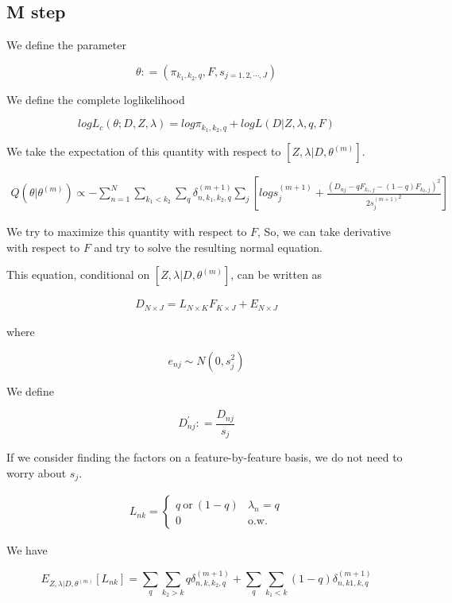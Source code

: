 \documentclass[12pt]{article}
\begin{document}
\subsection{M step}


We define the parameter 

$$ \theta : = \left (\pi_{k_1,k_2, q}, F, s_{j=1,2,\cdots,J} \right ) $$

We define the complete loglikelihood 

$$ log L_{c} \left (\theta; D, Z, \lambda \right ) = log \pi_{k_1,k_2, q} + log L (D | Z, \lambda, q, F) $$

We take the expectation of this quantity with respect to $\left [ Z, \lambda | D, \theta^{(m)} \right ]$.

\begin{eqnarray}
 Q (\theta | \theta^{(m)}) \propto - \sum_{n=1}^{N} \sum_{k_1 < k_2} \sum_{q} \delta^{(m+1)}_{n, k_1, k_2, q}  \sum_{j} \left [ log s^{(m+1)}_{j} + \frac{(D_{nj} - q F_{k_1,j} - (1-q) F_{k_2,j})^2}{2{s_j^{(m+1)}}^2} \right]
\end{eqnarray}

We try to maximize this quantity with respect to $F$, So, we can take derivative with respect to $F$ and try to solve the resulting normal equation.

This equation, conditional on $\left [ Z, \lambda | D, \theta^{(m)} \right ]$, can be written as 

\begin{eqnarray}
 D_{N \times J} = L_{N \times K} F_{K \times J} + E_{N \times J}
\end{eqnarray}

where 

$$ e_{nj} \sim N(0, s^2_{j}) $$

We define 

$$ D^{'}_{nj} : = \frac{D_{nj}}{s_{j}} $$

If we consider finding the factors on a feature-by-feature basis, we do not need to worry about $s_j$.

\begin{align*}
L_{nk} =
\begin{cases}
    q~\text{or}~(1-q) & \lambda_{n}=q \\
    0 & \text{o.w.}
\end{cases}
\end{align*}

We have 

$$ E_{ Z, \lambda | D, \theta^{(m)}} \left [ L_{nk} \right ] = \sum_{q}  \sum_{k_2 > k} q \delta^{(m+1)}_{n,k,k_2, q}  + \sum_{q}  \sum_{k_1 < k} (1-q) \delta^{(m+1)}_{n,k1,k,q}$$
\end{document}
